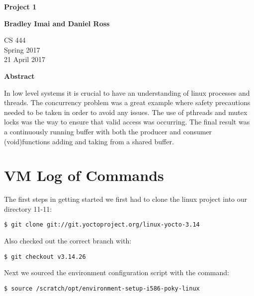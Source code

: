 \documentclass[letterpaper,10pt,titlepage]{article}
\begin{document}
\begin{titlepage}
    \begin{center}
        \vspace*{3.5cm}

        \textbf{Project 1}

        \vspace{0.5cm}

        \textbf{Bradley Imai and Daniel Ross}

        \vspace{0.8cm}

        CS 444\\
        Spring 2017\\
        21 April 2017\\

        \vspace{1cm}

        \textbf{Abstract}\\

        \vspace{0.5cm}

        In low level systems it is crucial to have an understanding of linux processes and threads. The concurrency problem was a great example where safety precautions needed to be taken in order to avoid any issues. The use of pthreads and mutex locks was the way to ensure that valid access was occurring. The final result was a continuously running buffer with both the producer and consumer (void)functions adding and taking from a shared buffer.\vfill


    \end{center}
\end{titlepage}

\newpage

\section{VM Log of Commands}
The first steps in getting started we first had to clone the linux project into our directory 11-11:
\begin{lstlisting}
$ git clone git://git.yoctoproject.org/linux-yocto-3.14
\end{lstlisting}

Also checked out the correct branch with:

\begin{lstlisting}
$ git checkout v3.14.26
\end{lstlisting}
Next we sourced the environment configuration script with the command:
\begin{lstlisting}
$ source /scratch/opt/environment-setup-i586-poky-linux
\end{lstlisting}
\end{document}
